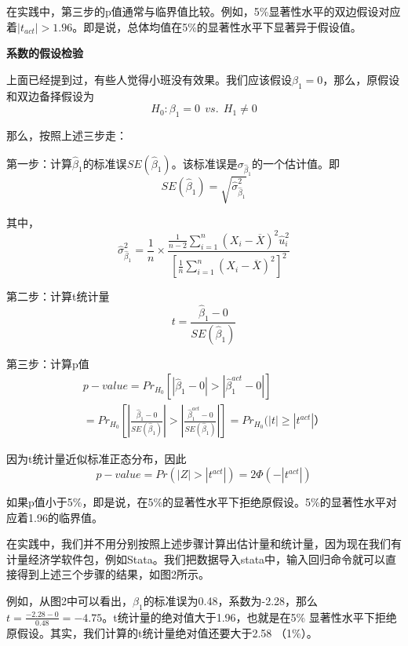 \documentclass[cn,10pt,math=newtx,citestyle=gb7714-2015,bibstyle=gb7714-2015]{elegantbook}
\begin{document}
	在实践中，第三步的p值通常与临界值比较。例如，5\%显著性水平的双边假设对应着$|t_{act}|>1.96$。即是说，总体均值在5\%的显著性水平下显著异于假设值。
	
	\textbf{系数的假设检验}
	
	上面已经提到过，有些人觉得小班没有效果。我们应该假设$\beta_1=0$，那么，原假设和双边备择假设为
	\begin{equation}
		H_0:\beta_1=0~~vs.~~H_1\neq0
	\end{equation}
	
	那么，按照上述三步走：
	
	第一步：计算$\hat{\beta}_1$的标准误$SE(\hat{\beta}_1)$。该标准误是$\sigma_{\hat{\beta}_1}$的一个估计值。即
	\begin{equation}
		SE(\hat{\beta}_1)=\sqrt{\hat{\sigma}_{\hat{\beta}_1}^2}
	\end{equation}
	
	其中，
	\begin{equation}
		\hat{\sigma}_{\hat{\beta}_1}^2=\frac{1}{n}\times\frac{\frac{1}{n-2}\sum_{i=1}^n{(X_i-\overline{X})^2\hat{u}_i^2}}{[\frac{1}{n}\sum_{i=1}^n{(X_i-\overline{X})^2}]^2}
	\end{equation}
	
	第二步：计算t统计量
	\begin{equation}
		t=\frac{\hat{\beta}_1-0}{SE(\hat{\beta}_1)}
	\end{equation}
	
	第三步：计算p值
	\begin{multline}
		p-value=Pr_{H_0}[|\hat{\beta}_1-0|>|\hat{\beta}_1^{act}-0|]\\
		=Pr_{H_0}[|\frac{\hat{\beta}_1-0}{SE(\hat{\beta}_1)}|>|\frac{\hat{\beta}_1^{act}-0}{SE(\hat{\beta}_1)}|]=Pr_{H_0}(|t|\geq|t^{act}|）
	\end{multline}
	
	因为t统计量近似标准正态分布，因此
	\begin{equation}
		p-value=Pr(|Z|>|t^{act}|)=2\Phi(-|t^{act}|)
	\end{equation}
	
	如果p值小于5\%，即是说，在5\%的显著性水平下拒绝原假设。5\%的显著性水平对应着1.96的临界值。
	
	在实践中，我们并不用分别按照上述步骤计算出估计量和统计量，因为现在我们有计量经济学软件包，例如Stata。我们把数据导入stata中，输入回归命令就可以直接得到上述三个步骤的结果，如图2所示。
	
	例如，从图2中可以看出，$\beta_1$的标准误为0.48，系数为-2.28，那么$t=\frac{-2.28-0}{0.48}=-4.75$。t统计量的绝对值大于1.96，也就是在5\% 显著性水平下拒绝原假设。其实，我们计算的t统计量绝对值还要大于2.58 （1\%）。
	
\end{document}
